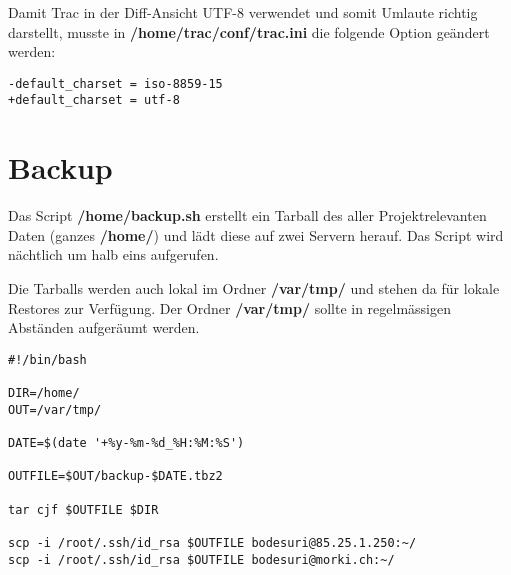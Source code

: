 \documentclass[12pt,halfparskip]{scrreprt}
\begin{document}
Damit Trac in der Diff-Ansicht UTF-8 verwendet und somit Umlaute richtig darstellt, musste in \textbf{/home/trac/conf/trac.ini} die folgende Option geändert werden:

\begin{verbatim}
-default_charset = iso-8859-15
+default_charset = utf-8
\end{verbatim}


\chapter{Backup} %
\label{cha:backup}

Das Script \textbf{/home/backup.sh} erstellt ein Tarball des aller Projektrelevanten Daten (ganzes \textbf{/home/}) und lädt diese auf zwei Servern herauf. Das Script wird nächtlich um halb eins aufgerufen.

Die Tarballs werden auch lokal im Ordner \textbf{/var/tmp/} und stehen da für lokale Restores zur Verfügung. Der Ordner \textbf{/var/tmp/} sollte in regelmässigen Abständen aufgeräumt werden.

\begin{verbatim}
#!/bin/bash

DIR=/home/
OUT=/var/tmp/

DATE=$(date '+%y-%m-%d_%H:%M:%S')

OUTFILE=$OUT/backup-$DATE.tbz2 

tar cjf $OUTFILE $DIR

scp -i /root/.ssh/id_rsa $OUTFILE bodesuri@85.25.1.250:~/
scp -i /root/.ssh/id_rsa $OUTFILE bodesuri@morki.ch:~/
\end{verbatim}
\end{document}
